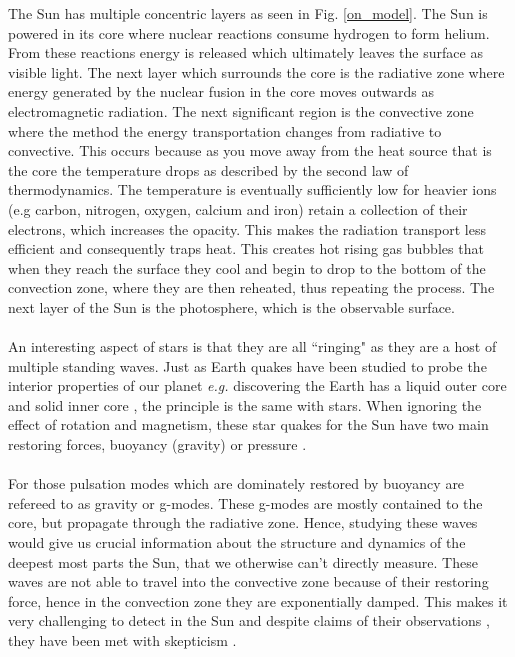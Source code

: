 \documentclass[12pt]{ociamthesis}
\newcommand{\np}{\\ \\}
\begin{document}
%
The Sun has multiple concentric layers as seen in Fig. \ref{on_model}. The Sun is powered in its core where nuclear reactions consume hydrogen to form helium. From these reactions energy is released which ultimately leaves the surface as visible light. The next layer which surrounds the core is the radiative zone where energy generated by the nuclear fusion in the core moves outwards as electromagnetic radiation. The next significant region is the convective zone where the method the energy transportation changes from radiative to convective. This occurs because as you move away from the heat source that is the core the temperature drops as described by the second law of thermodynamics. The temperature is eventually sufficiently low for heavier ions (e.g carbon, nitrogen, oxygen, calcium and iron) retain a collection of their electrons, which increases the opacity. This makes the radiation transport less efficient and consequently traps heat. This creates hot rising gas bubbles that when they reach the surface they cool and begin to drop to the bottom of the convection zone, where they are then reheated, thus repeating the process. The next layer of the Sun is the photosphere, which is the observable surface. \np
%
An interesting aspect of stars is that they are all ``ringing" as they are a host of multiple standing waves. Just as Earth quakes have been studied to probe the interior properties of our planet \textit{e.g.} discovering the Earth has a liquid outer core and solid inner core \citep{Lehmann1936}, the principle is the same with stars. When ignoring the effect of rotation and magnetism, these star quakes for the Sun have two main restoring forces, buoyancy (gravity) or pressure \citep{Appourchaux2010AARv18197A}. \np
%
For those pulsation modes which are dominately restored by buoyancy are refereed to as gravity or g-modes. These g-modes are mostly contained to the core, but propagate through the radiative zone. Hence, studying these waves would give us crucial information about the structure and dynamics of the deepest most parts the Sun, that we otherwise can't directly measure. These waves are not able to travel into the convective zone because of their restoring force, hence in the convection zone they are exponentially damped. This makes it very challenging to detect in the Sun and despite claims of their observations \citep{ Garc2007Sci3161591G, Fossat2017AA604A40F, Fossat2018AA612L1F}, they have been met with skepticism \citep{Appourchaux2010AARv18197A, Schunker2018SoPh29395S,Appourchaux2019AA624A106A, Scherrer2019ApJ87742S}. \np
%
\end{document}
